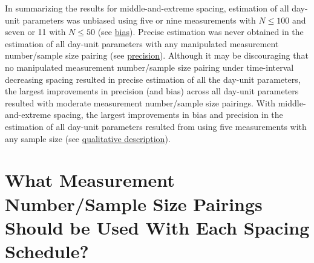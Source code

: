 \documentclass[
12pt, %
twoside,
english]{guelphthesis}
\begin{document}
In summarizing the results for middle-and-extreme spacing, estimation of all day-unit parameters was unbiased using five or nine measurements with \(N \le 100\) and seven or 11 with \(N \le 50\) (see \protect\hyperlink{bias-mid-ext-exp2}{bias}). Precise estimation was never obtained in the estimation of all day-unit parameters with any manipulated measurement number/sample size pairing (see \protect\hyperlink{precision-mid-ext-exp2}{precision}). Although it may be discouraging that no manipulated measurement number/sample size pairing under time-interval decreasing spacing resulted in precise estimation of all the day-unit parameters, the largest improvements in precision (and bias) across all day-unit parameters resulted with moderate measurement number/sample size pairings. With middle-and-extreme spacing, the largest improvements in bias and precision in the estimation of all day-unit parameters resulted from using five measurements with any sample size (see \protect\hyperlink{qualitative-mid-ext-exp2}{qualitative description}).

\hypertarget{what-measurement-numbersample-size-pairings-should-be-used-with-each-spacing-schedule}{%
\section{What Measurement Number/Sample Size Pairings Should be Used With Each Spacing Schedule?}\label{what-measurement-numbersample-size-pairings-should-be-used-with-each-spacing-schedule}}
\end{document}
